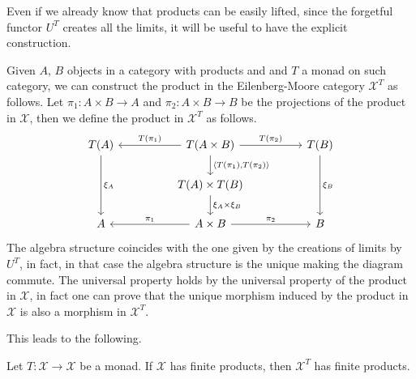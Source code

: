 Even if we already know that products can be easily lifted, since the forgetful functor $U^T$ creates all the limits, it will be useful to have the explicit construction.

\begin{rembox}{}
    \begin{rem}\label{product lift}
        Given $A$, $B$ objects in a category with products and and $T$ a monad on such category, we can construct the product in the Eilenberg-Moore category $\mathcal{X}^T$ as follows. Let $\pi_1:A\times B \to A$ and $\pi_2:A\times B \to B$ be the projections of the product in $\mathcal{X}$, then we define the product in $\mathcal{X}^T$ as follows.
\[
\begin{tikzcd}
T(A) \arrow[dd, "\xi_A"] &  & T(A\times B) \arrow[d, "{\langle T(\pi_1), T(\pi_2)\rangle}"] \arrow[rr, "T(\pi_2)"] \arrow[ll, "T(\pi_1)"'] &  & T(B) \arrow[dd, "\xi_B"] \\
                         &  & T(A)\times T(B) \arrow[d, "\xi_A \times \xi_B"]                                                              &  &                          \\
A                        &  & A\times B \arrow[rr, "\pi_2"] \arrow[ll, "\pi_1"']                                                           &  & B                       
\end{tikzcd}
\]
The algebra structure coincides with the one given by the creations of limits by $U^T$, in fact, in that case the algebra structure is the unique making the diagram commute. 
The universal property holds by the universal property of the product in $\mathcal{X}$, in fact one can prove that the unique morphism induced by the product in $\mathcal{X}$ is also a morphism in $\mathcal{X}^T$.
\end{rem}
\end{rembox}

This leads to the following.

\begin{mainbox}{}
    \begin{prop}
        Let $T:\mathcal{\mathcal{X}} \to \mathcal{X}$ be a monad. If $\mathcal{X}$ has finite products, then $\mathcal{X}^T$ has finite products.
    \end{prop}
\end{mainbox}

